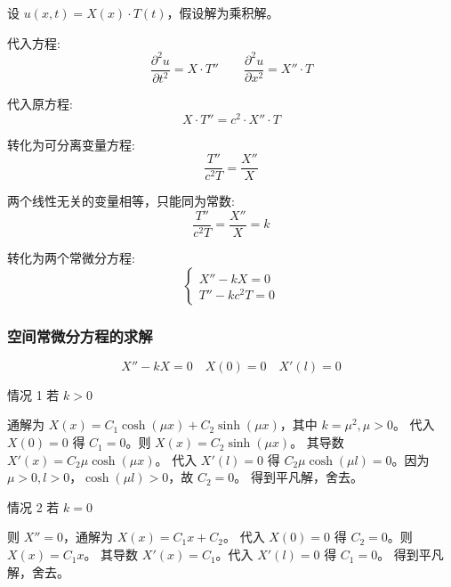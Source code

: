\documentclass[a4paper, 12pt, oneside]{article} %
\numberwithin{subsection}{section}
\numberwithin{subsubsection}{subsection}
\theoremstyle{plain}
\theoremstyle{definition}
\theoremstyle{remark}
\begin{document}
		设 \(u(x, t) = X(x) \cdot T(t)\)，假设解为乘积解。
		
		代入方程:
		\begin{equation} \label{eq:substitution_mixed1}
			\frac{\partial^2 u}{\partial t^2} = X \cdot T'' \qquad \frac{\partial^2 u}{\partial x^2} = X'' \cdot T
		\end{equation}
		
		代入原方程:
		\begin{equation} \label{eq:original_substitution_mixed1}
			X \cdot T'' = c^2 \cdot X'' \cdot T
		\end{equation}
		
		转化为可分离变量方程:
		\begin{equation} \label{eq:separation_mixed1}
			\frac{T''}{c^2 T} = \frac{X''}{X}
		\end{equation}
		
		两个线性无关的变量相等，只能同为常数:
		\begin{equation} \label{eq:constant_mixed1}
			\frac{T''}{c^2 T} = \frac{X''}{X} = k
		\end{equation}
		
		转化为两个常微分方程:
		\begin{equation} \label{eq:ode_mixed1}
			\begin{cases}
				X'' - kX = 0 \\
				T'' - k c^2 T = 0
			\end{cases}
		\end{equation}
		
		\subsubsection{空间常微分方程的求解}
		\begin{equation}
			X'' - kX = 0 \quad X(0) = 0 \quad X'(l) = 0
		\end{equation}
		
		情况 1 \quad 若 \(k > 0\)
		
		通解为 \(X(x) = C_1 \cosh(\mu x) + C_2 \sinh(\mu x)\)，其中 \(k = \mu^2, \mu>0\)。
		代入 $X(0)=0$ 得 $C_1=0$。则 $X(x) = C_2 \sinh(\mu x)$。
		其导数 $X'(x) = C_2 \mu \cosh(\mu x)$。
		代入 $X'(l)=0$ 得 $C_2 \mu \cosh(\mu l) = 0$。因为 $\mu>0, l>0$，$\cosh(\mu l)>0$，故 $C_2=0$。
		得到平凡解，舍去。
		
		情况 2 \quad 若 \(k = 0\)
		
		则 \(X'' = 0\)，通解为 $X(x) = C_1 x + C_2$。
		代入 $X(0)=0$ 得 $C_2=0$。则 $X(x) = C_1 x$。
		其导数 $X'(x) = C_1$。代入 $X'(l)=0$ 得 $C_1=0$。
		得到平凡解，舍去。
		
\end{document}
